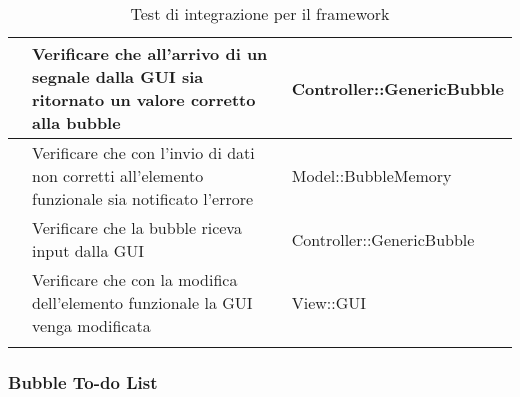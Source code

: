 \begin{longtable}{|c|P{7cm}|P{5cm}|}
	\hline {} & Verificare che all'arrivo di un segnale dalla GUI sia ritornato un valore corretto alla bubble & Controller::GenericBubble\\
	\hline {} & Verificare che con l'invio di dati non corretti all'elemento funzionale sia notificato l'errore & Model::BubbleMemory\\
	\hline {} & Verificare che la bubble riceva input dalla GUI & Controller::GenericBubble\\
	\hline {} & Verificare che con la modifica dell'elemento funzionale la GUI venga modificata & View::GUI\\
	\hline
	\caption{Test di integrazione per il framework}
\end{longtable}


\subsubsection{Bubble To-do List}

